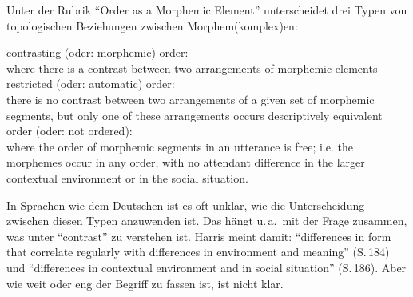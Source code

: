 \documentclass[output=paper]{langsci/langscibook}
\begin{document}
Unter der Rubrik "`Order as a Morphemic Element"' unterscheidet \citet[184--186]{Harris1951} drei Typen von topologischen Beziehungen zwischen Morphem\-(komplex)en:
\begin{exe}
\ex\label{ex:1-1-1}
\begin{xlist}
\ex\label{ex:1-1-1a} contrasting (oder: morphemic) order:\\
where there is a contrast between two arrangements of morphemic elements
\ex\label{ex:1-1-1b} restricted (oder: automatic) order: \\
there is no contrast between two arrangements of a given set of morphemic
segments, but only one of these arrangements occurs
\ex\label{ex:1-1-1c} descriptively equivalent order (oder: not ordered): \\
where the order of morphemic segments in an utterance is free; i.e. the morphemes occur in any order, with no attendant difference in the larger contextual environment or in the social situation.
\end{xlist}
\end{exe}
In Sprachen wie dem Deutschen ist es oft unklar, wie die Unterscheidung zwischen diesen Typen anzuwenden ist. Das hängt u.\,a.\ mit der Frage zusammen, was unter "`contrast"' zu verstehen ist. Harris meint damit: "`differences in form that correlate regularly with differences in environment and meaning"' (S.\,184) und "`differences
in contextual environment and in social situation"' (S.\,186). Aber wie weit oder eng der Begriff  zu fassen ist, ist nicht klar.
\end{document}

